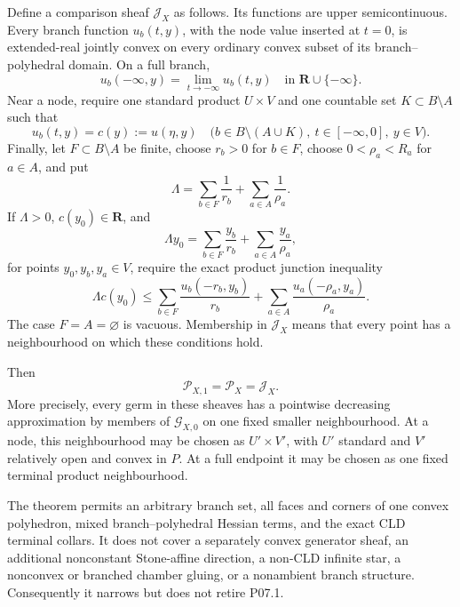 \begin{theorem}
Define a comparison sheaf \(\mathcal J_X\) as follows.  Its functions are
upper semicontinuous.  Every branch function \(u_b(t,y)\), with the node
value inserted at \(t=0\), is extended-real jointly convex on every ordinary
convex subset of its branch--polyhedral domain.  On a full branch,
\begin{equation}
 u_b(-\infty,y)=\lim_{t\to-\infty}u_b(t,y)
 \quad\text{in }\mathbf R\cup\{-\infty\}.
 \label{eq:p071-infinite-polyhedral-endpoint-trace}
\end{equation}
Near a node, require one standard product \(U\times V\) and one countable
set \(K\subset B\setminus A\) such that
\begin{equation}
 u_b(t,y)=c(y):=u(\eta,y)
 \quad
 \bigl(b\in B\setminus(A\cup K),\
       t\in[-\infty,0],\ y\in V\bigr).
 \label{eq:p071-infinite-polyhedral-countable-activity}
\end{equation}
Finally, let \(F\subset B\setminus A\) be finite, choose \(r_b>0\) for
\(b\in F\), choose \(0<\rho_a<R_a\) for \(a\in A\), and put
\[
 \Lambda=\sum_{b\in F}\frac1{r_b}
              +\sum_{a\in A}\frac1{\rho_a}.
\]
If \(\Lambda>0\), \(c(y_0)\in\mathbf R\), and
\begin{equation}
 \Lambda y_0=
   \sum_{b\in F}\frac{y_b}{r_b}
      +\sum_{a\in A}\frac{y_a}{\rho_a},
 \label{eq:p071-infinite-polyhedral-barycentre}
\end{equation}
for points \(y_0,y_b,y_a\in V\), require the exact product junction
inequality
\begin{equation}
 \Lambda c(y_0)\leq
   \sum_{b\in F}\frac{u_b(-r_b,y_b)}{r_b}
      +\sum_{a\in A}\frac{u_a(-\rho_a,y_a)}{\rho_a}.
 \label{eq:p071-infinite-polyhedral-junction}
\end{equation}
The case \(F=A=\varnothing\) is vacuous.  Membership in
\(\mathcal J_X\) means that every point has a neighbourhood on which these
conditions hold.

Then
\begin{equation}
                 \mathcal P_{X,1}=\mathcal P_X=\mathcal J_X.
 \label{eq:p071-infinite-polyhedral-collapse}
\end{equation}
More precisely, every germ in these sheaves has a pointwise decreasing
approximation by members of \(\mathcal G_{X,0}\) on one fixed smaller
neighbourhood.  At a node, this neighbourhood may be chosen as
\(U'\times V'\), with \(U'\) standard and \(V'\) relatively open and
convex in \(P\).  At a full endpoint it may be chosen as one fixed terminal
product neighbourhood.

The theorem permits an arbitrary branch set, all faces and corners of one
convex polyhedron, mixed branch--polyhedral Hessian terms, and the exact CLD
terminal collars.  It does not cover a separately convex generator sheaf,
an additional nonconstant Stone-affine direction, a non-CLD infinite star,
a nonconvex or branched chamber gluing, or a nonambient branch structure.
Consequently it narrows but does not retire P07.1.
\end{theorem}
